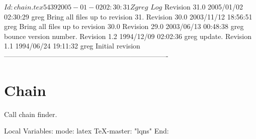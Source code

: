\C 
\C $Id: chain.tex 5439 2005-01-02 02:30:31Z greg $
\C 
\C $Log$
\C Revision 31.0  2005/01/02 02:30:29  greg
\C Bring all files up to revision 31.
\C
\C Revision 30.0  2003/11/12 18:56:51  greg
\C Bring all files up to revision 30.0
\C
\C Revision 29.0  2003/06/13 00:48:38  greg
\C bounce version number.
\C
\C Revision 1.2  1994/12/09 02:02:36  greg
\C update.
\C
%
\C Revision 1.1  1994/06/24  19:11:32  greg
\C Initial revision
\C
\C
\C ----------------------------------------------------------------------
\section{Chain}

Call chain finder.

\label{sec:chain-findInterlock}

\C Local Variables: 
\C mode: latex
\C TeX-master: "lqns"
\C End: 
